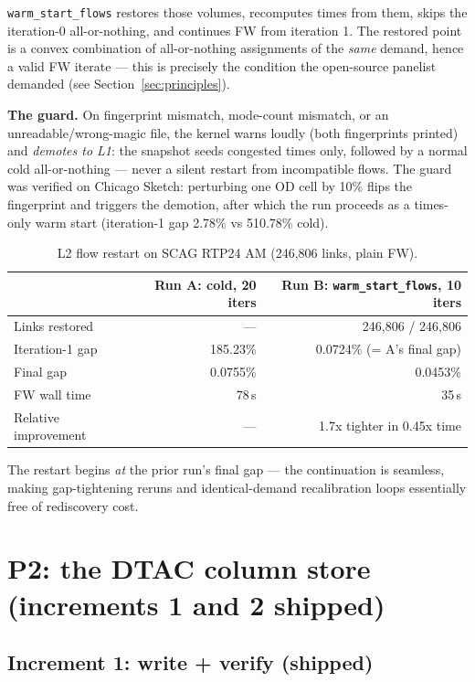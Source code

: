 \documentclass[10pt]{article}
\newcommand{\code}[1]{\texttt{#1}}
\begin{document}
\code{warm\_start\_flows} restores those volumes, recomputes times from them,
skips the iteration-0 all-or-nothing, and continues FW from iteration 1. The
restored point is a convex combination of all-or-nothing assignments of the
\emph{same} demand, hence a valid FW iterate --- this is precisely the condition
the open-source panelist demanded (see Section~\ref{sec:principles}).

\textbf{The guard.} On fingerprint mismatch, mode-count mismatch, or an
unreadable/wrong-magic file, the kernel warns loudly (both fingerprints
printed) and \emph{demotes to L1}: the snapshot seeds congested times only,
followed by a normal cold all-or-nothing --- never a silent restart from
incompatible flows. The guard was verified on Chicago Sketch: perturbing one OD
cell by 10\% flips the fingerprint and triggers the demotion, after which the
run proceeds as a times-only warm start (iteration-1 gap 2.78\% vs 510.78\%
cold).

\begin{table}[h]
\centering
\caption{L2 flow restart on SCAG RTP24 AM (246{,}806 links, plain FW).}
\label{tab:l2}
\begin{tabular}{lrr}
\toprule
 & Run A: cold, 20 iters & Run B: \code{warm\_start\_flows}, 10 iters \\
\midrule
Links restored           & ---              & 246{,}806 / 246{,}806 \\
Iteration-1 gap          & 185.23\%         & 0.0724\% (= A's final gap) \\
Final gap                & 0.0755\%         & 0.0453\% \\
FW wall time             & 78\,s            & 35\,s \\
Relative improvement     & ---              & 1.7x tighter in 0.45x time \\
\bottomrule
\end{tabular}
\end{table}

The restart begins \emph{at} the prior run's final gap --- the continuation is
seamless, making gap-tightening reruns and identical-demand recalibration loops
essentially free of rediscovery cost.

\section{P2: the DTAC column store (increments 1 and 2 shipped)}

\subsection{Increment 1: write + verify (shipped)}
\end{document}
